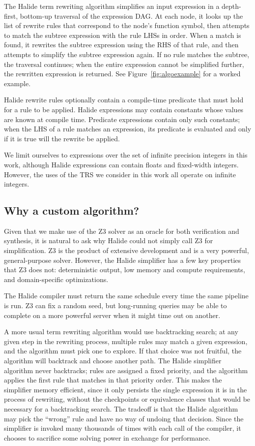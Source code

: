 \documentclass[sigplan,10pt,review,anonymous]{acmart}\settopmatter{printfolios=true,printccs=false,printacmref=false}
\begin{document}
The Halide term rewriting algorithm simplifies an input expression in a
depth-first, bottom-up traversal of the expression DAG. At each node, it looks
up the list of rewrite rules that correspond to the node's function symbol, then
attempts to match the subtree expression with the rule LHSs in order. When a
match is found, it rewrites the subtree expression using the RHS of that rule,
and then attempts to simplify the subtree expression again. If no rule matches
the subtree, the traversal continues; when the entire expression cannot be
simplified further, the rewritten expression is returned. See Figure~\ref{fig:algoexample} for a worked example. 

Halide rewrite rules optionally contain a compile-time predicate that must hold for a rule to
be applied. Halide expressions may contain constants whose values are known at
compile time. Predicate expressions contain only such constants; when the
LHS of a rule matches an expression, its predicate is evaluated and only if it
is true will the rewrite be applied.

We limit ourselves to expressions over the set of infinite precision integers in
this work, although Halide expressions can contain floats and fixed-width
integers. However, the uses of the TRS we consider in this work all operate
on infinite integers.

\subsection{Why a custom algorithm?}

Given that we make use of the Z3 solver as an oracle for both verification and synthesis, it is natural to ask why Halide could not simply call Z3 for simplification. Z3 is the product of extensive development and is a very powerful, general-purpose solver. However, the Halide simplifier has a few key properties that Z3 does not: deterministic output, low memory and compute requirements, and domain-specific optimizations.

The Halide compiler must return the same schedule every time the same pipeline is run. Z3 can fix a random seed, but long-running queries may be able to complete on a more powerful server when it might time out on another.

A more usual term rewriting algorithm would use backtracking search; at any given step in the rewriting process, multiple rules may match a given expression, and the algorithm must pick one to explore. If that choice was not fruitful, the algorithm will backtrack and choose another path. The Halide simplifier algorithm never backtracks; rules are assigned a fixed priority, and the algorithm applies the first rule that matches in that priority order. This makes the simplifier memory efficient, since it only persists the single expression it is in the process of rewriting, without the checkpoints or equivalence classes that would be necessary for a backtracking search. The tradeoff is that the Halide algorithm may pick the ``wrong'' rule and have no way of undoing that decision. Since the simplifier is invoked many thousands of times with each call of the compiler, it chooses to sacrifice some solving power in exchange for performance. 
\end{document}
